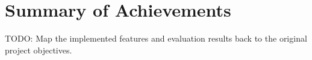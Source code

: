 \section{Summary of Achievements}

TODO: Map the implemented features and evaluation results back to the original project objectives.
